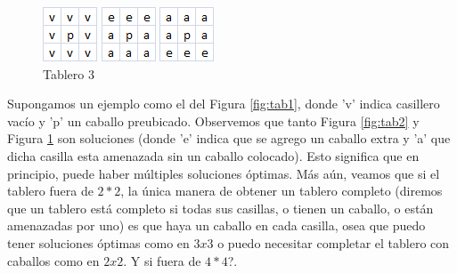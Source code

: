 \begin{figure}[!htb]
  \includegraphics[scale=1]{imagenes/tab1.png}
  \caption{Tablero 1}\label{fig:tab1}
\endminipage\hfill
{}
  \includegraphics[scale=1]{imagenes/tab2.png}
  \caption{Tablero 2}\label{fig:tab2}
\endminipage\hfill
{}%
  \includegraphics[scale=1]{imagenes/tab3.png}
  \caption{Tablero 3}\label{fig:tab3}
\endminipage
\end{figure}




Supongamos un ejemplo como el del Figura \ref{fig:tab1}, donde 'v' indica casillero vacío y 'p' un caballo preubicado. Observemos que tanto Figura \ref{fig:tab2} y Figura \ref{fig:tab3} son soluciones (donde 'e' indica que se agrego un caballo extra y 'a' que dicha casilla esta amenazada sin un caballo colocado). Esto significa que en principio, puede haber múltiples soluciones óptimas. Más aún, veamos que si el tablero fuera de $2*2$, la única manera de obtener un tablero completo (diremos que un tablero está completo si todas sus casillas, o tienen un caballo, o están amenazadas por uno) es que haya un caballo en cada casilla, osea que puedo tener soluciones óptimas como en $3x3$ o puedo necesitar completar el tablero con caballos como en $2x2$. Y si fuera de $4*4$?.


